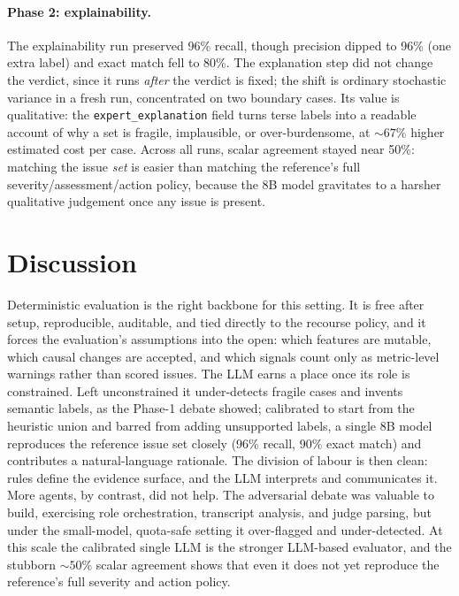 \documentclass[letterpaper]{article}
\begin{document}
\paragraph{Phase 2: explainability.}
The explainability run preserved 96\% recall, though precision dipped to 96\% (one extra label) and exact match fell to 80\%. The explanation step did not change the verdict, since it runs \emph{after} the verdict is fixed; the shift is ordinary stochastic variance in a fresh run, concentrated on two boundary cases. Its value is qualitative: the \texttt{expert\_explanation} field turns terse labels into a readable account of why a set is fragile, implausible, or over-burdensome, at ${\sim}67\%$ higher estimated cost per case. Across all runs, scalar agreement stayed near 50\%: matching the issue \emph{set} is easier than matching the reference's full severity/assessment/action policy, because the 8B model gravitates to a harsher qualitative judgement once any issue is present.

\section{Discussion}
Deterministic evaluation is the right backbone for this setting. It is free after setup, reproducible, auditable, and tied directly to the recourse policy, and it forces the evaluation's assumptions into the open: which features are mutable, which causal changes are accepted, and which signals count only as metric-level warnings rather than scored issues. The LLM earns a place once its role is constrained. Left unconstrained it under-detects fragile cases and invents semantic labels, as the Phase-1 debate showed; calibrated to start from the heuristic union and barred from adding unsupported labels, a single 8B model reproduces the reference issue set closely (96\% recall, 90\% exact match) and contributes a natural-language rationale. The division of labour is then clean: rules define the evidence surface, and the LLM interprets and communicates it. More agents, by contrast, did not help. The adversarial debate was valuable to build, exercising role orchestration, transcript analysis, and judge parsing, but under the small-model, quota-safe setting it over-flagged and under-detected. At this scale the calibrated single LLM is the stronger LLM-based evaluator, and the stubborn ${\sim}50\%$ scalar agreement shows that even it does not yet reproduce the reference's full severity and action policy.
\end{document}
